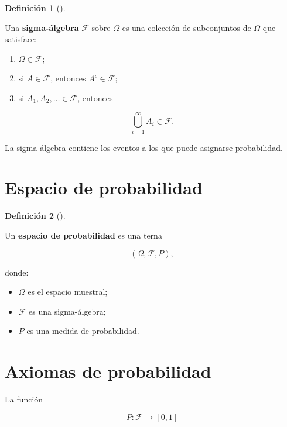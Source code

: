 \documentclass[
  spanish,
  11pt,
  letterpaper,
  DIV=11,
  numbers=noendperiod]{scrreprt}
\providecommand{\tightlist}{%
  \setlength{\itemsep}{0pt}\setlength{\parskip}{0pt}}
\theoremstyle{definition}
\newtheorem{definition}{Definición}[chapter]
\theoremstyle{plain}
\theoremstyle{definition}
\theoremstyle{remark}
\begin{document}
\begin{definition}[]\protect\hypertarget{def-sigma-algebra}{}\label{def-sigma-algebra}

Una \textbf{sigma-álgebra} \(\mathcal{F}\) sobre \(\Omega\) es una
colección de subconjuntos de \(\Omega\) que satisface:

\begin{enumerate}
\def\labelenumi{\arabic{enumi}.}
\tightlist
\item
  \(\Omega\in\mathcal{F}\);
\item
  si \(A\in\mathcal{F}\), entonces \(A^c\in\mathcal{F}\);
\item
  si \(A_1,A_2,\ldots\in\mathcal{F}\), entonces
\end{enumerate}

\[
\bigcup_{i=1}^{\infty}A_i\in\mathcal{F}.
\]

\end{definition}

La sigma-álgebra contiene los eventos a los que puede asignarse
probabilidad.

\section{Espacio de probabilidad}\label{espacio-de-probabilidad}

\begin{definition}[]\protect\hypertarget{def-espacio-probabilidad}{}\label{def-espacio-probabilidad}

Un \textbf{espacio de probabilidad} es una terna

\[
(\Omega,\mathcal{F},P),
\]

donde:

\begin{itemize}
\tightlist
\item
  \(\Omega\) es el espacio muestral;
\item
  \(\mathcal{F}\) es una sigma-álgebra;
\item
  \(P\) es una medida de probabilidad.
\end{itemize}

\end{definition}

\section{Axiomas de probabilidad}\label{axiomas-de-probabilidad}

La función

\[
P:\mathcal{F}\to[0,1]
\]
\end{document}
